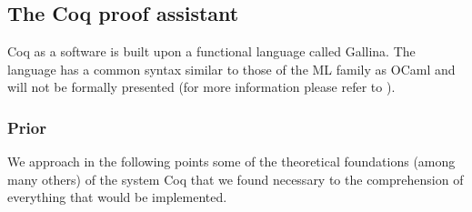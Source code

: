 \documentclass{article}
\begin{document}
    

    \subsection{The Coq proof assistant}
    Coq as a software is built upon a functional language called Gallina. The language has a common syntax similar to those of the ML family as OCaml and will not be formally presented (for more information please refer to \cite{Coq}).
        \subsubsection{Prior}
        We approach in the following points some of the theoretical foundations (among many others)  of the system Coq that we found necessary to the comprehension of everything that would be implemented.
\end{document}
